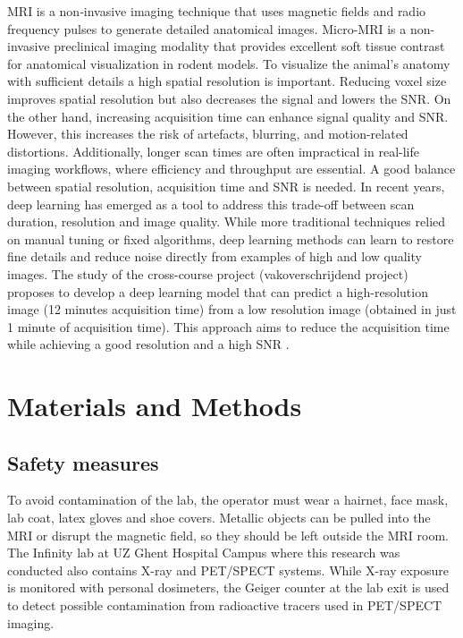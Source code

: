 \documentclass[twocolumn]{article}
\begin{document}
MRI is a non‐invasive imaging technique that uses magnetic fields and radio frequency pulses to generate detailed anatomical images. Micro-MRI is a non-invasive preclinical imaging modality that provides excellent soft tissue contrast for anatomical visualization in rodent models. To visualize the animal's anatomy with sufficient details a high spatial resolution is important. Reducing voxel size improves spatial resolution but also decreases the signal and lowers the SNR. On the other hand, increasing acquisition time can enhance signal quality and SNR. However, this increases the risk of artefacts, blurring, and motion-related distortions. Additionally, longer scan times are often impractical in real-life imaging workflows, where efficiency and throughput are essential. A good balance between spatial resolution, acquisition time and SNR is needed.
In recent years, deep learning has emerged as a tool to address this trade-off between scan duration, resolution and image quality. While more traditional techniques relied on manual tuning or fixed algorithms, deep learning methods can learn to restore fine details and reduce noise directly from examples of high and low quality images. 
The study of the cross-course project (vakoverschrijdend project) proposes to develop a deep learning model that can predict a high-resolution image (12 minutes acquisition time) from a low resolution image (obtained in just 1 minute of acquisition time). This approach aims to reduce the acquisition time while achieving a good resolution and a high SNR \cite{brown2014magnetic}. 

\twocolumn
\section{Materials and Methods}
\subsection{Safety measures}

To avoid contamination of the lab, the operator must wear a hairnet, face mask, lab coat, latex gloves and shoe covers. Metallic objects can be pulled into the MRI or disrupt the magnetic field, so they should be left outside the MRI room. The Infinity lab at UZ Ghent Hospital Campus where this research was conducted also contains X-ray and PET/SPECT systems. While X-ray exposure is monitored with personal dosimeters, the Geiger counter at the lab exit is used to detect possible contamination from radioactive tracers used in PET/SPECT imaging.
\end{document}
